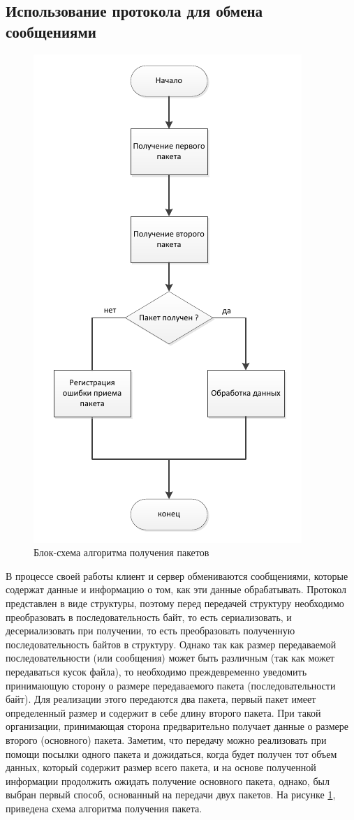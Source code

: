 \subsection{Использование протокола для обмена сообщениями}
\begin{figure}[tb!]
    \centering
    \includegraphics[scale=0.8]{pic_11}
    \caption{Блок-схема алгоритма получения пакетов}\label{pic_11}
\end{figure}
В процессе своей работы клиент и сервер обмениваются сообщениями,
которые содержат данные и информацию о том, как эти данные обрабатывать.
Протокол представлен в виде структуры, поэтому перед передачей структуру
необходимо преобразовать в последовательность байт, то есть сериализовать,
и десериализовать при получении, то есть преобразовать полученную
последовательность байтов в структуру. Однако так как размер передаваемой
последовательности (или сообщения) может быть различным (так как может
передаваться кусок файла), то необходимо преждевременно уведомить
принимающую сторону о размере передаваемого пакета (последовательности
байт). Для реализации этого передаются два пакета, первый пакет имеет
определенный размер и содержит в себе длину второго пакета. При такой
организации, принимающая сторона предварительно получает данные о
размере второго (основного) пакета. Заметим, что передачу можно
реализовать при помощи посылки одного пакета и дожидаться, когда будет
получен тот объем данных, который содержит размер всего пакета, и на
основе полученной информации продолжить ожидать получение основного
пакета, однако, был выбран первый способ, основанный на передачи двух
пакетов.
\newpar
На рисунке \ref{pic_11}, приведена схема алгоритма получения пакета.
